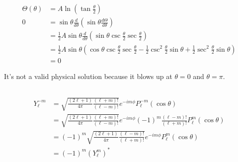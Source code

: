 \documentclass{article}
\begin{document}
\subsection{}

\begin{align*}
  \Theta(\theta) & = A \ln \left( \tan \frac{\theta}{2} \right)                                                                                                                                                           \\
  0              & = \sin \theta \frac{d}{d \theta} \left( \sin \theta \frac{d \Theta}{d \theta} \right)                                                                                                                  \\
                 & = \frac{1}{2} A \sin \theta \frac{d}{d \theta} \left( \sin \theta \csc \frac{\theta}{2} \sec \frac{\theta}{2} \right)                                                                                  \\
                 & = \frac{1}{2} A \sin \theta \left( \cos \theta \csc \frac{\theta}{2} \sec \frac{\theta}{2} - \frac{1}{2} \csc^2 \frac{\theta}{2} \sin \theta + \frac{1}{2} \sec^2 \frac{\theta}{2} \sin \theta \right) \\
                 & = 0
\end{align*}

It's not a valid physical solution because it blows up at $\theta = 0$ and $\theta = \pi$.

\subsection{}

\begin{align*}
  Y_\ell^{-m} & = \sqrt{\frac{(2 \ell + 1)}{4 \pi} \frac{(\ell + m)!}{(\ell - m)!}} e^{-i m \phi} P_\ell^{-m} (\cos \theta)                                    \\
              & = \sqrt{\frac{(2 \ell + 1)}{4 \pi} \frac{(\ell + m)!}{(\ell - m)!}} e^{-i m \phi} (-1)^m \frac{(\ell - m)!}{(\ell + m)!} P_\ell^m(\cos \theta) \\
              & = (-1)^m \sqrt{\frac{(2 \ell + 1)}{4 \pi} \frac{(\ell - m)!}{(\ell + m)!}} e^{-i m \phi} P_\ell^m(\cos \theta)                                 \\
              & = (-1)^m (Y_\ell^m)^*
\end{align*}

\subsection{}
\end{document}
